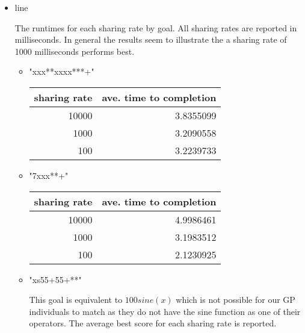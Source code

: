 \documentclass[11pt]{article}
\begin{document}
\begin{itemize}

\item line\\
\label{sec-1.5.3.1}

The runtimes for each sharing rate by goal.  All sharing rates are
reported in milliseconds.  In general the results seem to illustrate
the a sharing rate of 1000 milliseconds performs best.
\begin{itemize}

\item "xxx**xxxx***+"\\
\label{sec-1.5.3.1.1}


\begin{center}
\begin{tabular}{rr}
 sharing rate  &  ave. time to completion  \\
\hline
        10000  &                3.8355099  \\
         1000  &                3.2090558  \\
          100  &                3.2239733  \\
\end{tabular}
\end{center}




\item "7xxx**+"\\
\label{sec-1.5.3.1.2}


\begin{center}
\begin{tabular}{rr}
 sharing rate  &  ave. time to completion  \\
\hline
        10000  &                4.9986461  \\
         1000  &                3.1983512  \\
          100  &                2.1230925  \\
\end{tabular}
\end{center}




\item "xs55+55+**"\\
\label{sec-1.5.3.1.3}

This goal is equivalent to $100 sine(x)$ which is not possible for our
GP individuals to match as they do not have the sine function as one
of their operators.  The average best score for each sharing rate is
reported.


\end{itemize}
\end{itemize}
\end{document}

